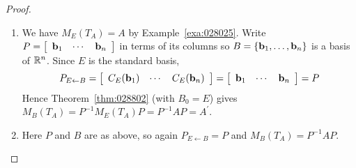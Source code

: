 \begin{proof}
\begin{enumerate}
\item We have $M_{E}(T_{A}) = A$ by Example~\ref{exa:028025}. Write $P = \left[ \begin{array}{ccc} \textbf{b}_{1} & \cdots & \textbf{b}_{n} \end{array} \right]$ in terms of its columns so $B = \{\textbf{b}_{1}, \dots, \textbf{b}_{n}\}$ is a basis of $\mathbb{R}^n$. Since $E$ is the standard basis,
\begin{equation*}
P_{E \gets B} = \left[ \begin{array}{ccc} C_E(\textbf{b}_1) & \cdots & C_E(\textbf{b}_n) \end{array} \right] = \left[ \begin{array}{ccc} \textbf{b}_1 & \cdots & \textbf{b}_n \end{array} \right] = P
\end{equation*}
Hence Theorem~\ref{thm:028802} (with $B_{0} = E$) gives $M_{B}(T_{A}) = P^{-1}M_{E}(T_{A})P = P^{-1}AP = A^{\prime}$.

\item Here $P$ and $B$ are as above, so again $P_{E \gets B} = P$ and $M_{B}(T_{A}) = P^{-1}AP$.

\end{enumerate}
\vspace*{-2em}\end{proof}

